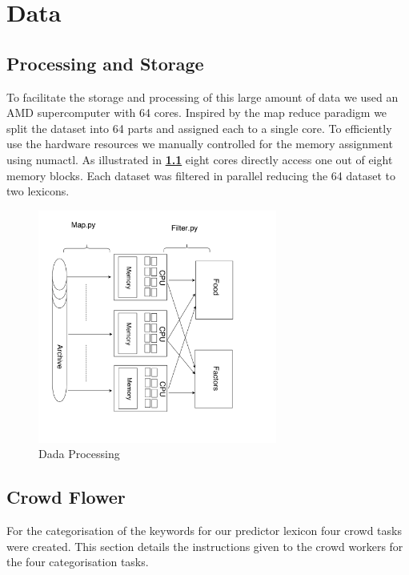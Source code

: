 \chapter{Data}

\section{Processing and Storage}

To facilitate the storage and processing of this large amount of data we used an AMD supercomputer with 64 cores. Inspired by the  map reduce paradigm we split the dataset into 64 parts and assigned each to a single core. To efficiently use the hardware resources we manually controlled for the memory assignment using numactl. As illustrated in\textbf{ \ref{fig:dataProcessing}} eight cores directly access one out of eight memory blocks. Each dataset was filtered in parallel reducing the 64 dataset to two lexicons. 

 \begin{figure}[H]
\centerline{ \noindent\includegraphics[width=0.7\textwidth]{img/abs/hw_model}}
 \caption{Dada Processing}
 \label{fig:dataProcessing}
\end{figure}

\section{Crowd Flower}

For the categorisation of the keywords for our predictor lexicon four crowd tasks were created. This section details the instructions given to the crowd workers for the four categorisation tasks. 

